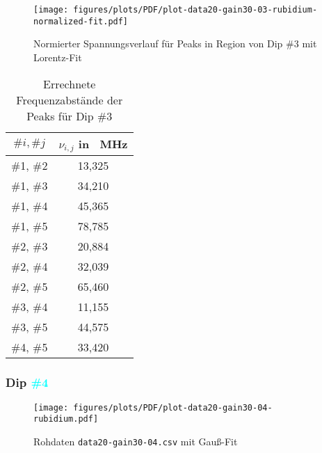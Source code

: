 \begin{minipage}{12cm}
\begin{figure}[H]
    \centering
    \texttt{[image: figures/plots/PDF/plot-data20-gain30-03-rubidium-normalized-fit.pdf]}
    \caption{Normierter Spannungsverlauf für Peaks in Region von Dip \textcolor{pink!50!purple}{\#3} mit Lorentz-Fit}
    \label{fig:plot-data20-gain30-03-rubidium-normalized-fit}
\end{figure}
\end{minipage}
\hskip0.5cm
\begin{minipage}{4cm}
\begin{table}[H]
    \centering
    \begin{tabular}{|c|c|}
        \hline
         $\#i, \#j$         &       $\nu_{i,j}$ in \SI{}{\mega \hertz}      \\
        \hline
        \hline
         \#1, \#2           &       13,325      \\
        \hline
         \#1, \#3           &       34,210      \\
        \hline
         \#1, \#4           &       45,365      \\
        \hline
         \#1, \#5           &       78,785      \\
        \hline
         \#2, \#3           &       20,884      \\
        \hline
         \#2, \#4           &       32,039      \\
        \hline
         \#2, \#5           &       65,460      \\
        \hline
         \#3, \#4           &       11,155      \\
        \hline
         \#3, \#5           &       44,575      \\
        \hline
         \#4, \#5           &       33,420      \\
        \hline 
    \end{tabular}
    \caption{Errechnete Frequenzabstände der Peaks für Dip \textcolor{pink!50!purple}{\#3}}
    \label{tab:plot-data20-gain30-03}
\end{table}
\end{minipage}

\subsubsection{Dip \textcolor{cyan}{\#4}}

\begin{figure}[H]
    \centering
    \texttt{[image: figures/plots/PDF/plot-data20-gain30-04-rubidium.pdf]}
    \caption{Rohdaten \lstinline{data20-gain30-04.csv} mit Gauß-Fit}
    \label{fig:plot-data20-gain30-04-rubidium}
\end{figure}

